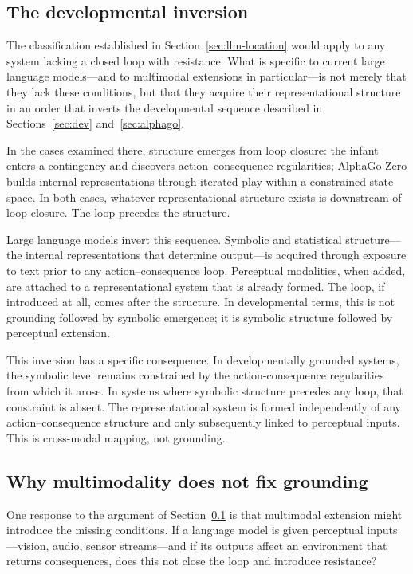 \documentclass[11pt]{article}
\begin{document}
\subsection{The developmental inversion}
\label{sec:inversion}

The classification established in Section~\ref{sec:llm-location} would
apply to any system lacking a closed loop with resistance. What is
specific to current large language models---and to multimodal
extensions in particular---is not merely that they lack these
conditions, but that they acquire their representational structure in
an order that inverts the developmental sequence described in
Sections~\ref{sec:dev} and~\ref{sec:alphago}.

In the cases examined there, structure emerges from loop closure: the
infant enters a contingency and discovers action--consequence
regularities; AlphaGo Zero builds internal representations through
iterated play within a constrained state space. In both cases,
whatever representational structure exists is downstream of loop
closure. The loop precedes the structure.

Large language models invert this sequence. Symbolic and statistical
structure---the internal representations that determine output---is
acquired through exposure to text prior to any action--consequence
loop. Perceptual modalities, when added, are attached to a
representational system that is already formed. The loop, if
introduced at all, comes after the structure. In developmental terms,
this is not grounding followed by symbolic emergence; it is symbolic
structure followed by perceptual extension.

This inversion has a specific consequence. In developmentally grounded
systems, the symbolic level remains constrained by the action-consequence
regularities from which it arose. In systems where symbolic structure
precedes any loop, that constraint is absent. The representational
system is formed independently of any action--consequence structure
and only subsequently linked to perceptual inputs. This is cross-modal
mapping, not grounding.

\subsection{Why multimodality does not fix grounding}
\label{sec:multimodal}

One response to the argument of Section~\ref{sec:inversion} is that
multimodal extension might introduce the missing conditions. If a
language model is given perceptual inputs---vision, audio, sensor
streams---and if its outputs affect an environment that returns
consequences, does this not close the loop and introduce resistance?
\end{document}
